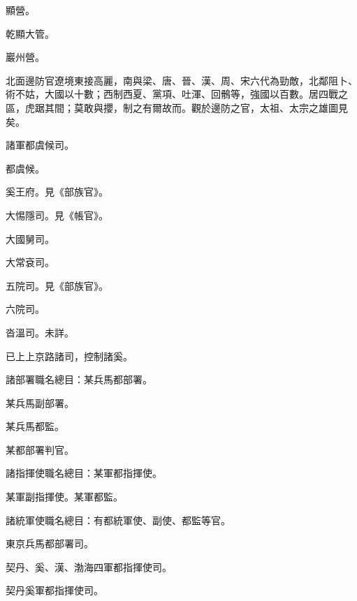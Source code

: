 \begin{pinyinscope}
 顯營。



 乾顯大管。



 巖州營。



 北面邊防官遼境東接高麗，南與梁、唐、晉、漢、周、宋六代為勁敵，北鄰阻卜、術不姑，大國以十數；西制西夏、黨項、吐渾、回鶻等，強國以百數。居四戰之區，虎踞其間；莫敢與攖，制之有爾故而。觀於邊防之官，太祖、太宗之雄圖見矣。



 諸軍都虞候司。



 都虞候。



 奚王府。見《部族官》。



 大惕隱司。見《帳官》。



 大國舅司。



 大常袞司。



 五院司。見《部族官》。



 六院司。



 沓溫司。未詳。



 已上上京路諸司，控制諸奚。



 諸部署職名總目：某兵馬都部署。



 某兵馬副部署。



 某兵馬都監。



 某都部署判官。



 諸指揮使職名總目：某軍都指揮使。



 某軍副指揮使。某軍都監。



 諸統軍使職名總目：有都統軍使、副使、都監等官。



 東京兵馬都部署司。



 契丹、奚、漢、渤海四軍都指揮使司。



 契丹奚軍都指揮使司。




\end{pinyinscope}
